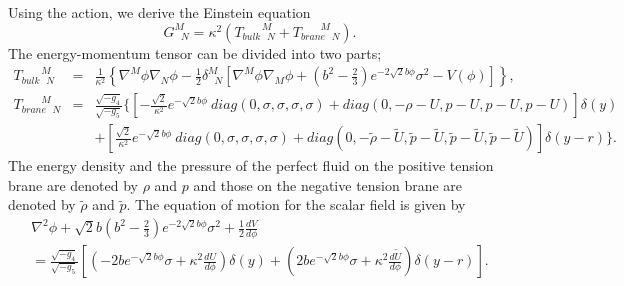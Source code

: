 \documentclass[a4paper,11pt]{article}
\begin{document}
Using the action, we derive the Einstein equation 
\begin{equation}
G_{\mbox{ }N}^{M} = 
\kappa^2 (T_{bulk \mbox{ }N}^{\mbox{ }\mbox{ }\mbox{ }M} 
+ T_{brane \mbox{ }N}^{\mbox{ }\mbox{ }\mbox{ }M}). 
\end{equation}
The energy-momentum tensor can be divided into two parts;
\begin{eqnarray}
T_{bulk \mbox{ }N}^{\mbox{ }\mbox{ }\mbox{ }M} &=& \frac{1}{\kappa^2}
\left\{
\nabla^M \phi \nabla_N \phi 
-\frac{1}{2}\delta_{\mbox{ }N}^{M}
\left[
\nabla^M \phi \nabla_M \phi 
+\left(
b^2 -\frac{2}{3}
\right)
 e^{-2\sqrt{2}b\phi}\sigma^2
-V(\phi)
\right]
\right\}, \nonumber \\
T_{brane \mbox{ }N}^{\mbox{ }\mbox{ }\mbox{ }M} &=& 
\frac{\sqrt{-g_4}}{\sqrt{-g_5}}
\Bigg\{
\left[
-\frac{\sqrt{2}}{\kappa^2}e^{-\sqrt{2}b\phi}\ 
diag(0,\sigma,\sigma,\sigma,\sigma)
+diag(0,-\rho-U,p-U,p-U,p-U)
\right]\delta (y) \nonumber \\
\mbox{ }\hspace{1cm} & & +\left[
\frac{\sqrt{2}}{\kappa^2}e^{-\sqrt{2}b\phi} \ 
diag(0,\sigma,\sigma,\sigma,\sigma)
+diag(0,-\tilde{\rho}-\tilde{U},\tilde{p}-\tilde{U},
\tilde{p}-\tilde{U},\tilde{p}-\tilde{U})
\right]\delta (y-r)
\Bigg\}.
\end{eqnarray}
The energy density and the pressure of the perfect 
fluid on the positive tension brane are denoted by 
$\rho$ and $p$ and those on the negative tension brane
are denoted by $\tilde{\rho}$ and $\tilde{p}$. 
The equation of motion for the scalar field is given by 
\begin{multline}
\nabla^2 \phi 
+ \sqrt{2}b\left(b^2-\frac{2}{3}\right)
e^{-2\sqrt{2} b \phi} \sigma^2 +\frac{1}{2} \frac{d V}{d \phi} \nonumber \\
=\frac{\sqrt{-g_4}}{\sqrt{-g_5}}
 \left[
  \left(
   -2be^{-\sqrt{2} b \phi} \sigma 
   +\kappa^2 \frac{d U}{d \phi}
  \right) \delta (y) 
  +\left(
   2be^{-\sqrt{2} b \phi} \sigma 
   +\kappa^2 \frac{d \tilde{U}}{d \phi}
  \right) \delta (y-r) 
 \right]. 
\end{multline}
\end{document}
